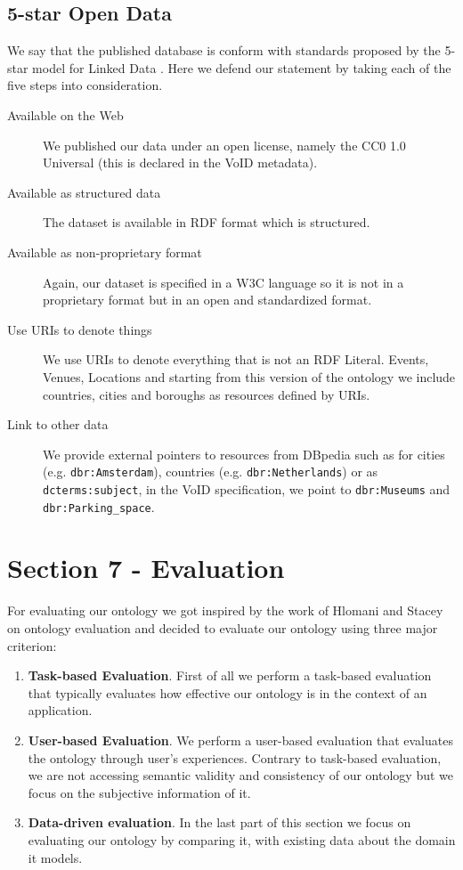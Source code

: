 \documentclass[runningheads,a4paper]{../../StyleFiles/llncs}
\begin{document}
\subsection{5-star Open Data}
We say that the published database is conform with standards proposed by the
5-star model for Linked Data \cite{janowicz2014five}. Here we defend our statement by taking each of the
five steps into consideration.

\begin{description}
\item[Available on the Web] We published our data under an open license,
namely the CC0 1.0 Universal (this is declared in the VoID metadata).
\item[Available as structured data] The dataset is available in RDF
format which is structured.
\item[Available as non-proprietary format] Again, our dataset is specified
in a W3C language so it is not in a proprietary format but in an
open and standardized format.
\item[Use URIs to denote things] We use URIs to denote everything that is
not an RDF Literal. Events, Venues, Locations and starting from this version of
the ontology we include countries, cities and boroughs as resources defined by
URIs.
\item[Link to other data] We provide external pointers to resources from
DBpedia such as for cities (e.g. \texttt{dbr:Amsterdam}), countries (e.g.
\texttt{dbr:Netherlands}) or as \texttt{dcterms:subject}, in the VoID
specification, we point to \texttt{dbr:Museums} and \texttt{dbr:Parking\_space}.
\end{description}


\section{Section 7 - Evaluation}
For evaluating our ontology we got inspired by the work of Hlomani and Stacey \cite{hlomani2014approaches} on ontology evaluation and decided to evaluate our ontology using three major criterion:
\begin{enumerate}
	\item \textbf{Task-based Evaluation}. First of all we perform a task-based evaluation that typically evaluates how effective our ontology is in the context of an application.
	\item \textbf{User-based Evaluation}. We perform a user-based evaluation that evaluates the ontology through user's experiences. Contrary to task-based evaluation, we are not accessing semantic validity and consistency of our ontology but we focus on the subjective information of it.
	\item \textbf{Data-driven evaluation}. In the last part of this section we focus on evaluating our ontology by comparing it, with existing data about the domain it models.
\end{enumerate} 
\end{document}
